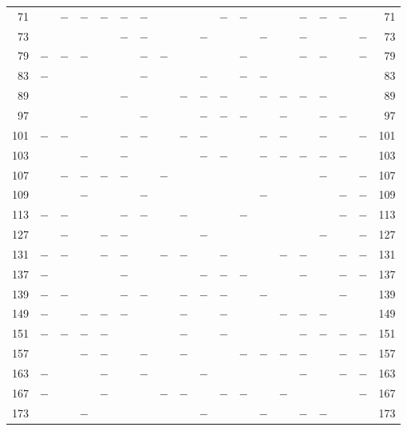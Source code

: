 \begin{center}
\begin{tabular}{r|c|c|c|c|c|c|c|c|c|c|c|c|c|c|c|c|c|r}
71 &  & $-$ & $-$ & $-$ & $-$ & $-$ &  &  &  & $-$ & $-$ &  &  & $-$ & $-$ & $-$ &  & 71\\
73 &  &  &  &  & $-$ & $-$ &  &  & $-$ &  &  & $-$ &  & $-$ &  &  & $-$ & 73\\
79 & $-$ & $-$ & $-$ &  &  & $-$ & $-$ &  &  &  & $-$ &  &  & $-$ & $-$ &  & $-$ & 79\\
83 & $-$ &  &  &  &  & $-$ &  &  & $-$ &  & $-$ & $-$ &  &  &  &  &  & 83\\
89 &  &  &  &  & $-$ &  &  & $-$ & $-$ & $-$ &  & $-$ & $-$ & $-$ & $-$ &  &  & 89\\
97 &  &  & $-$ &  &  & $-$ &  &  & $-$ & $-$ & $-$ &  & $-$ &  & $-$ & $-$ &  & 97\\
101 & $-$ & $-$ &  &  & $-$ & $-$ &  & $-$ & $-$ &  &  & $-$ & $-$ &  & $-$ &  & $-$ & 101\\
103 &  &  & $-$ &  & $-$ &  &  &  & $-$ & $-$ &  & $-$ & $-$ & $-$ & $-$ & $-$ &  & 103\\
107 &  & $-$ & $-$ & $-$ & $-$ &  & $-$ &  &  &  &  &  &  &  & $-$ &  & $-$ & 107\\
109 &  &  & $-$ &  &  & $-$ &  &  &  &  &  & $-$ &  &  &  & $-$ & $-$ & 109\\
113 & $-$ & $-$ &  &  & $-$ & $-$ &  & $-$ &  &  & $-$ &  &  &  &  & $-$ & $-$ & 113\\
127 &  & $-$ &  & $-$ & $-$ &  &  &  & $-$ &  &  &  &  &  & $-$ &  & $-$ & 127\\
131 & $-$ & $-$ &  & $-$ & $-$ &  & $-$ & $-$ &  & $-$ &  &  & $-$ & $-$ &  & $-$ & $-$ & 131\\
137 & $-$ &  &  &  & $-$ &  &  &  & $-$ & $-$ & $-$ &  &  & $-$ &  & $-$ & $-$ & 137\\
139 & $-$ & $-$ &  &  & $-$ & $-$ &  & $-$ & $-$ & $-$ &  & $-$ &  &  &  & $-$ &  & 139\\
149 & $-$ &  & $-$ & $-$ & $-$ &  &  & $-$ &  & $-$ &  &  & $-$ & $-$ & $-$ &  &  & 149\\
151 & $-$ & $-$ & $-$ & $-$ &  &  &  & $-$ &  & $-$ &  &  &  & $-$ & $-$ & $-$ & $-$ & 151\\
157 &  &  & $-$ & $-$ &  & $-$ &  & $-$ &  &  & $-$ & $-$ & $-$ & $-$ &  & $-$ & $-$ & 157\\
163 & $-$ &  &  & $-$ &  & $-$ &  &  & $-$ &  &  &  &  & $-$ &  & $-$ & $-$ & 163\\
167 & $-$ &  &  & $-$ &  &  & $-$ & $-$ &  & $-$ & $-$ &  & $-$ &  &  &  & $-$ & 167\\
173 &  &  & $-$ &  &  &  &  &  & $-$ &  &  & $-$ &  & $-$ & $-$ &  &  & 173\\

\end{tabular}
\end{center}
